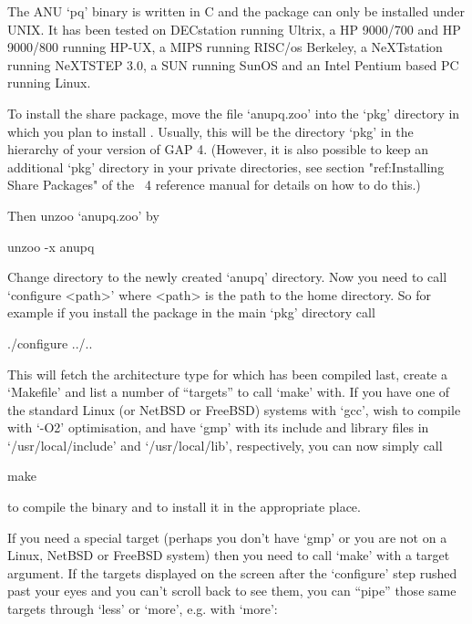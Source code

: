 


The ANU `pq' binary is written in C and the package can only be installed
under UNIX. It has  been  tested  on  DECstation  running  Ultrix,  a  HP
9000/700 and HP 9000/800 running HP-UX, a MIPS running RISC/os  Berkeley,
a NeXTstation running NeXTSTEP 3.0, a SUN  running  SunOS  and  an  Intel
Pentium based PC running Linux.

To install the {\ANUPQ} share package, move the file `anupq.zoo' into the
`pkg' directory in which you plan to install {\ANUPQ}. Usually, this will
be the directory `pkg' in  the  hierarchy  of  your  version  of  GAP  4.
(However, it is also possible to keep an additional  `pkg'  directory  in
your private directories, see section "ref:Installing Share Packages"  of
the {\GAP}~4 reference manual for details on how to do this.)

Then unzoo `anupq.zoo' by

\begintt
unzoo -x anupq
\endtt

Change directory to the newly created `anupq' directory. Now you need  to
call `configure <path>' where <path> is  the  path  to  the  {\GAP}  home
directory. So for example if you install the package in  the  main  `pkg'
directory call

\begintt
./configure ../..
\endtt

This will fetch the architecture type for which {\GAP} has been  compiled
last, create a `Makefile' and list a number of ``targets'' to call `make'
with. If you have one of  the  standard  Linux  (or  NetBSD  or  FreeBSD)
systems with `gcc', wish to compile with  `-O2'  optimisation,  and  have
`gmp' with its include and  library  files  in  `/usr/local/include'  and
`/usr/local/lib', respectively, you can now simply call

\begintt
make
\endtt

to compile the binary and to install it in the appropriate place.

If you need a special target (perhaps you don't have `gmp' or you are not
on a Linux, NetBSD or FreeBSD system) then you need to call `make' with a
target argument. If  the  targets  displayed  on  the  screen  after  the
`configure' step rushed past your eyes and you can't scroll back  to  see
them, you can ``pipe'' those same targets through `less' or `more',  e.g.
with `more':

